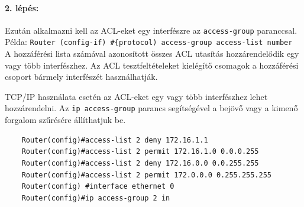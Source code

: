\paragraph{2. lépés:} Ezután alkalmazni kell az ACL-eket egy interfészre az \verb|access-group| paranccsal.\\
Példa: \verb|Router (config-if) #{protocol) access-group access-list number|\\
A hozzáférési lista számával azonosított összes ACL utasítás hozzárendelődik egy vagy több
interfészhez. Az ACL tesztfeltételeket kielégítő csomagok a hozzáférési csoport bármely
interfészét használhatják.

TCP/IP használata esetén az ACL-eket egy vagy több interfészhez lehet hozzárendelni.
Az \verb|ip access-group| parancs segítségével a bejövő vagy a kimenő forgalom szűrésére
állíthatjuk be.

\begin{verbatim}
	Router(config)#access-list 2 deny 172.16.1.1
	Router(config)#access-list 2 permit 172.16.1.0 0.0.0.255
	Router(config)#access-list 2 deny 172.16.0.0 0.0.255.255
	Router(config)#access-list 2 permit 172.0.0.0 0.255.255.255
	Router(config) #interface ethernet 0
	Router(config)#ip access-group 2 in
\end{verbatim}

